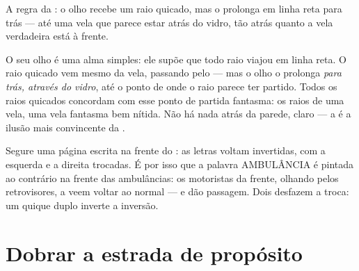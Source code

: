 \begin{omfigure}

{\small A regra da : o olho recebe um raio quicado, mas o
prolonga em linha reta para trás --- até uma vela que parece estar
atrás do vidro, tão atrás quanto a vela verdadeira está à frente.}
\end{omfigure}

\begin{example}\label{ex:g5:mirrors-reflection:why}
O seu olho é uma alma simples: ele supõe que todo raio viajou em
linha reta. O raio quicado vem mesmo da vela, passando pelo 
--- mas o olho o prolonga \emph{para trás, através do vidro}, até o
ponto de onde o raio parece ter partido. Todos os raios quicados
concordam com esse ponto de partida fantasma: os raios de uma vela,
uma vela fantasma bem nítida. Não há nada atrás da parede, claro ---
a  é a ilusão mais convincente da .
\end{example}

\begin{example}\label{ex:g5:mirrors-reflection:swap}
Segure uma página escrita na frente do : as letras voltam
invertidas, com a esquerda e a direita trocadas. É por isso que a
palavra AMBULÂNCIA é pintada ao contrário na frente das ambulâncias:
os motoristas da frente, olhando pelos retrovisores, a veem voltar ao
normal --- e dão passagem. Dois  desfazem a troca: um quique
duplo inverte a inversão.
\end{example}

\section{Dobrar a estrada de propósito}

